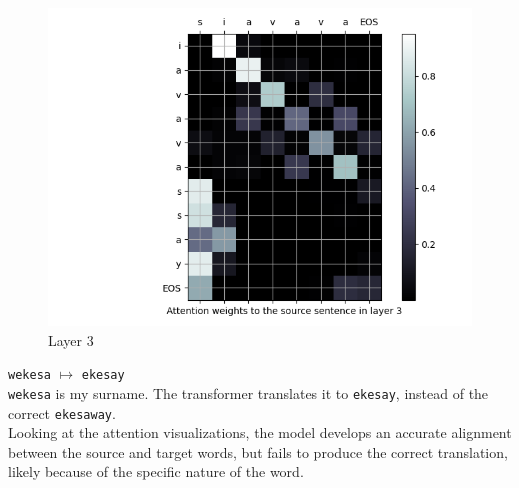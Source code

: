 \begin{enumarabic}
\begin{figure}[H]
\begin{minipage}[b]{0.33\textwidth}
        \centering
        \includegraphics[width=\textwidth]{figures/siavava-2.png}
        \caption{Layer 3}
        \label{fig:siavava-2}
      \end{minipage}
    \end{figure}

  \item \verb|wekesa| $\mapsto$ \verb|ekesay| \\
    \verb|wekesa| is my surname.
    The transformer translates it to \verb|ekesay|, instead of the correct \verb|ekesaway|. \\
    Looking at the attention visualizations, the model
    develops an accurate alignment between the source and target words,
    but fails to produce the correct translation, likely because of the specific
    nature of the word.


\end{enumarabic}
